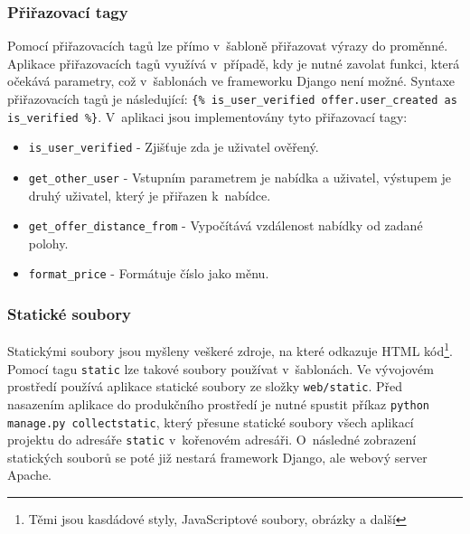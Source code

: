 \subsubsection{Přiřazovací tagy}
\begin{sloppypar}
Pomocí přiřazovacích tagů lze přímo v~šabloně přiřazovat výrazy do proměnné. Aplikace přiřazovacích tagů využívá v~případě, kdy je nutné zavolat funkci, která očekává parametry, což v~šablonách ve frameworku Django není možné. Syntaxe přiřazovacích tagů je následující: \mbox{\texttt{\{\% is\_user\_verified offer.user\_created as is\_verified \%\}}}. V~aplikaci jsou implementovány tyto přiřazovací tagy:
\begin{itemize}
    \item \texttt{is\_user\_verified} - Zjišťuje zda je uživatel ověřený.
    \item \texttt{get\_other\_user} - Vstupním parametrem je nabídka a uživatel, výstupem je druhý uživatel, který je přiřazen k~nabídce.
    \item \texttt{get\_offer\_distance\_from} - Vypočítává vzdálenost nabídky od zadané polohy.
    \item \texttt{format\_price} - Formátuje číslo jako měnu.
\end{itemize}
\end{sloppypar}

\subsubsection{Statické soubory}
Statickými soubory jsou myšleny veškeré zdroje, na které odkazuje HTML kód\footnote{Těmi jsou kasdádové styly, JavaScriptové soubory, obrázky a další}. Pomocí tagu \texttt{static} lze takové soubory používat v~šablonách. Ve vývojovém prostředí používá aplikace statické soubory ze složky \texttt{web/static}. Před nasazením aplikace do produkčního prostředí je nutné spustit příkaz \mbox{\texttt{python manage.py collectstatic}}, který přesune statické soubory všech aplikací projektu do adresáře \texttt{static} v~kořenovém adresáři. O~následné zobrazení statických souborů se poté již nestará framework Django, ale webový server Apache.

